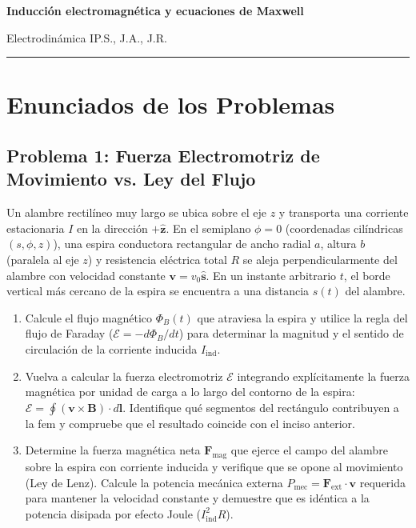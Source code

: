 \documentclass[11pt]{article}
\newcommand{\encabezado}[3]{%
  {\Large\bfseries #1\par}
  \vspace{2pt}
  {\normalsize #2\hfill #3\par}
  \vspace{6pt}\hrule\vspace{8pt}}
\begin{document}
\encabezado{Inducción electromagnética y ecuaciones de Maxwell}
{Electrodinámica I}{P.S., J.A., J.R.}

\section*{Enunciados de los Problemas}



\subsection*{Problema 1: Fuerza Electromotriz de Movimiento vs. Ley del Flujo}
Un alambre rectilíneo muy largo se ubica sobre el eje $z$ y transporta una corriente estacionaria $I$ en la dirección $+\hat{\mathbf{z}}$. En el semiplano $\phi = 0$ (coordenadas cilíndricas $(s, \phi, z)$), una espira conductora rectangular de ancho radial $a$, altura $b$ (paralela al eje $z$) y resistencia eléctrica total $R$ se aleja perpendicularmente del alambre con velocidad constante $\mathbf{v} = v_0 \hat{\mathbf{s}}$. En un instante arbitrario $t$, el borde vertical más cercano de la espira se encuentra a una distancia $s(t)$ del alambre.
\begin{enumerate}
    \item[a)] Calcule el flujo magnético $\Phi_B(t)$ que atraviesa la espira y utilice la regla del flujo de Faraday ($\mathcal{E} = -d\Phi_B/dt$) para determinar la magnitud y el sentido de circulación de la corriente inducida $I_{\text{ind}}$.
    \item[b)] Vuelva a calcular la fuerza electromotriz $\mathcal{E}$ integrando explícitamente la fuerza magnética por unidad de carga a lo largo del contorno de la espira: $\mathcal{E} = \oint (\mathbf{v} \times \mathbf{B}) \cdot d\mathbf{l}$. Identifique qué segmentos del rectángulo contribuyen a la fem y compruebe que el resultado coincide con el inciso anterior.
    \item[c)] Determine la fuerza magnética neta $\mathbf{F}_{\text{mag}}$ que ejerce el campo del alambre sobre la espira con corriente inducida y verifique que se opone al movimiento (Ley de Lenz). Calcule la potencia mecánica externa $P_{\text{mec}} = \mathbf{F}_{\text{ext}} \cdot \mathbf{v}$ requerida para mantener la velocidad constante y demuestre que es idéntica a la potencia disipada por efecto Joule ($I_{\text{ind}}^2 R$).
\end{enumerate}
\end{document}

